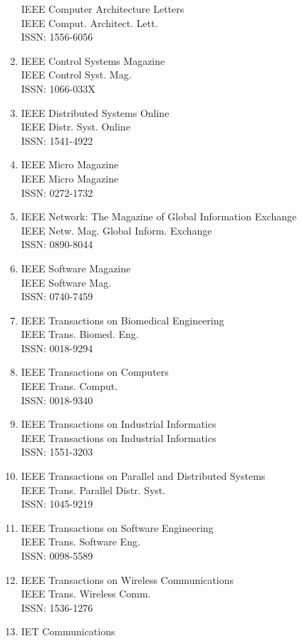 \begin{enumerate}
 IEEE Computer Architecture Letters\\
 IEEE Comput. Architect. Lett.\\
 ISSN: 1556-6056
\item
 IEEE Control Systems Magazine\\
 IEEE Control Syst. Mag.\\
 ISSN: 1066-033X
\item
 IEEE Distributed Systems Online\\
 IEEE Distr. Syst. Online\\
 ISSN: 1541-4922
\item
 IEEE Micro Magazine\\
 IEEE Micro Magazine\\
 ISSN: 0272-1732
\item
 IEEE Network: The Magazine of Global Information Exchange\\
 IEEE Netw. Mag. Global Inform. Exchange\\
 ISSN: 0890-8044
\item
 IEEE Software Magazine\\
 IEEE Software Mag.\\
 ISSN: 0740-7459
\item
 IEEE Transactions on Biomedical Engineering\\
 IEEE Trans. Biomed. Eng.\\
 ISSN: 0018-9294
\item
 IEEE Transactions on Computers\\
 IEEE Trans. Comput.\\
 ISSN: 0018-9340
\item
 IEEE Transactions on Industrial Informatics\\
 IEEE Transactions on Industrial Informatics\\
 ISSN: 1551-3203
\item
 IEEE Transactions on Parallel and Distributed Systems\\
 IEEE Trans. Parallel Distr. Syst.\\
 ISSN: 1045-9219
\item
 IEEE Transactions on Software Engineering\\
 IEEE Trans. Software Eng.\\
 ISSN: 0098-5589
\item
 IEEE Transactions on Wireless Communications\\
 IEEE Trans. Wireless Comm.\\
 ISSN: 1536-1276
\item
 IET Communications\\

\end{enumerate}
